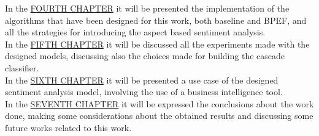 In the \hyperref[algorithms]{\textcolor[RGB]{35,103,148}{FOURTH CHAPTER}} it will be presented the implementation of the algorithms that have been designed for this work, both baseline and \ac{BPEF}, and all the strategies for introducing the aspect based sentiment analysis.\\
In the \hyperref[experiments]{\textcolor[RGB]{35,103,148}{FIFTH CHAPTER}} it will be discussed all the experiments made with the designed models, discussing also the choices made for building the cascade classifier.\\
In the \hyperref[industrial-use-case]{\textcolor[RGB]{35,103,148}{SIXTH CHAPTER}} it will be presented a use case of the designed sentiment analysis model, involving the use of a business intelligence tool.\\
In the \hyperref[conclusion]{\textcolor[RGB]{35,103,148}{SEVENTH CHAPTER}} it will be expressed the conclusions about the work done, making some considerations about the obtained results and discussing some future works related to this work.\\

